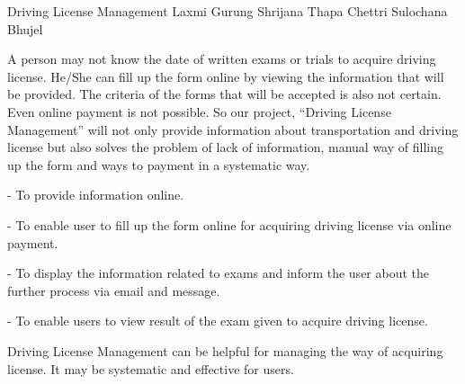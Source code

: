  \begin{conf-abstract}[]
 {Driving License Management }
 {Laxmi Gurung
 	Shrijana Thapa Chettri
 	Sulochana Bhujel
 }
{}

A person may not know the date of written exams or trials to acquire driving license. He/She can fill up the form online by viewing the information that will be provided. The criteria of the forms that will be accepted is also not certain. Even online payment is not possible. So our project, “Driving License Management” will not only provide information about transportation and driving license but also solves the problem of lack of information, manual way of filling up the form and ways to payment in a systematic way.

-	To provide information online.

-	To enable user to fill up the form online for acquiring driving license      via online payment.

-	To display the information related to exams and inform the user about the further process via email and message.

-	To enable users to view result of the exam given to acquire driving license.

Driving License Management can be helpful for managing the way of acquiring license. It may be systematic and effective for users.
 \end{conf-abstract}